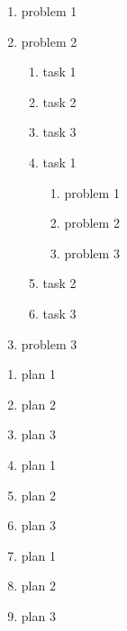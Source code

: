 \documentclass{weekly}
\begin{document}
    \thisweekproblem
    \begin{enumerate}
        \item problem 1
        \item problem 2
        \begin{enumerate}
            \item task 1
            \item task 2
            \item task 3
            \item task 1
            \begin{enumerate}
                \item problem 1
                \item problem 2
                \item problem 3
            \end{enumerate}
            \item task 2
            \item task 3
        \end{enumerate}
        \item problem 3
    \end{enumerate}
    \nextweekplan
    \begin{enumerate}
        \item plan 1
        \item plan 2
        \item plan 3
        \item plan 1
        \item plan 2
        \item plan 3
        \item plan 1
        \item plan 2
        \item plan 3
    \end{enumerate}
\end{document}

